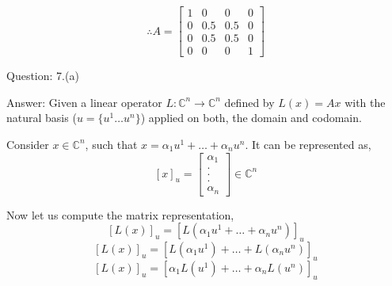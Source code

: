 \documentclass[a4paper]{article}
\begin{document}
\begin{qalist}
		\begin{equation}
			\therefore A = \begin{bmatrix}1 & 0 & 0 & 0 \\ 0 & 0.5 & 0.5 & 0\\ 0 & 0.5 & 0.5 & 0 \\ 0 & 0 & 0 & 1\end{bmatrix}
		\end{equation}

		\item[Question: 7.(a)] \setcounter{equation}{0} %
		\item[Answer:] Given a linear operator $L  : {\mathbb{C}}^{n} \rightarrow {\mathbb{C}}^{n}$ defined by $L(x) = Ax$ with the natural basis ($u = \{{u}^{1} \ldots {u}^{n}\}$) applied on both, the domain and codomain.
		
			Consider $x \in {\mathbb{C}}^{n}$, such that $x = {\alpha}_{1}{u}^{1} + \ldots + {\alpha}_{n}{u}^{n}$. It can be represented as,
			\begin{equation}
				{[x]}_{u} = \begin{bmatrix} {\alpha}_{1} \\ .\\ .\\ . \\ {\alpha}_{n}\end{bmatrix} \in {\mathbb{C}}^{n}
			\end{equation}
			
			Now let us compute the matrix representation, 
			\begin{equation}
				{[L(x)]}_{u} = {[L( {\alpha}_{1}{u}^{1} + \ldots + {\alpha}_{n}{u}^{n})]}_{u}
			\end{equation}
			\begin{equation}
				{[L(x)]}_{u} = {[L({\alpha}_{1}{u}^{1}) + \ldots + L({\alpha}_{n}{u}^{n})]}_{u}
			\end{equation}
			\begin{equation}
				{[L(x)]}_{u} = {[{\alpha}_{1}L({u}^{1}) + \ldots + {\alpha}_{n}L({u}^{n})]}_{u}
			\end{equation}
			

\end{qalist}
\end{document}
